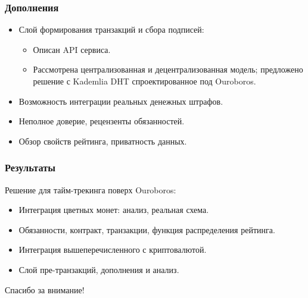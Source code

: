 \documentclass[11pt,handout,pdf,hyperref={unicode}]{beamer}
\newcommand{\backupbegin}{
   \newcounter{finalframe}
   \setcounter{finalframe}{\value{framenumber}}
}
\begin{document}
\begin{frame}
  \frametitle{Дополнения}

  \begin{itemize}
  \item Слой формирования транзакций и сбора подписей:
      \begin{itemize}
      \item Описан API сервиса.
      \item Рассмотрена централизованная и децентрализованная модель;
        предложено решение с Kademlia DHT спроектированное под
        Ouroboros.
      \end{itemize}
  \item Возможность интеграции реальных денежных штрафов.
  \item Неполное доверие, рецензенты обязанностей.
  \item Обзор свойств рейтинга, приватность данных.
  \end{itemize}
\end{frame}

\begin{frame}
  \frametitle{Результаты}

  Решение для тайм-трекинга поверх Ouroboros:
  \begin{itemize}
  \item Интеграция цветных монет: анализ, реальная схема.
  \item Обязанности, контракт, транзакции, функция распределения
    рейтинга.
  \item Интеграция вышеперечисленного с криптовалютой.
  \item Слой пре-транзакций, дополнения и анализ.
  \end{itemize}
   \begin{center}
    \Huge Спасибо за внимание!
  \end{center}
\end{frame}

\backupbegin
\section{}
\end{document}
